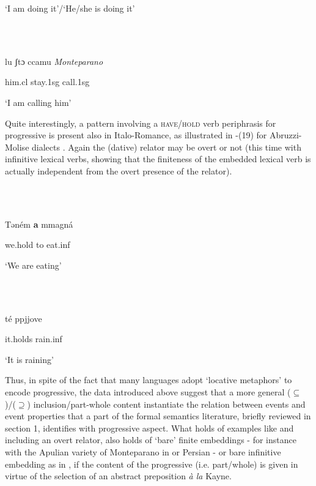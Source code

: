 \documentclass[output=paper,colorlinks,citecolor=brown]{./langscibook}
\begin{document}
‘I am doing it’/‘He/she is doing it’

\ea%
    \label{ex:key:17}
    \gll\\
        \\
    \glt
    \z

          lu   ʃtɔ   ccamu         \textit{Monteparano} 

him.cl stay.1sg   call.1sg 

‘I am calling him’      

Quite interestingly, a pattern involving a \textsc{have/hold} verb periphrasis for progressive is present also in Italo-Romance, as illustrated in -(19) for Abruzzi-Molise dialects \citep[555]{Cinque2017}. Again the (dative) relator may be overt  or not  (this time with infinitive lexical verbs, showing that the finiteness of the embedded lexical verb is actually independent from the overt presence of the relator). 

\ea%
    \label{ex:key:18}
    \gll\\
        \\
    \glt
    \z

             Təném   \textbf{a}   mmagná  \citep[133]{Rohlfs1969}

we.hold   to   eat.inf      

‘We are eating’ 

\ea%
    \label{ex:key:19}
    \gll\\
        \\
    \glt
    \z

            té     ppjjove     \citep[266]{Ledgeway2016} 

it.holds   rain.inf

‘It is raining’

Thus, in spite of the fact that many languages adopt ‘locative metaphors’ to encode progressive, the data introduced above suggest that a more general (${\subseteq}$)/(${\supseteq}$) inclusion/part-whole content instantiate the relation between events and event properties that a part of the formal semantics literature, briefly reviewed in section 1, identifies with progressive aspect.\textsuperscript{} What holds of examples like  and  including an overt relator, also holds of ‘bare’ finite embeddings - for instance with the Apulian variety of Monteparano in  or Persian  - or bare infinitive embedding as in , if the content of the progressive (i.e. part/whole) is given in virtue of the selection of an abstract preposition \textit{à la} Kayne. 
\end{document}

